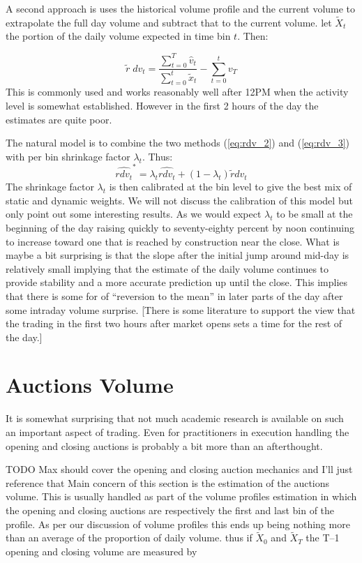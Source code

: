 A second approach is uses the historical volume profile and the current volume to extrapolate the full day volume and subtract that to the current volume. let $\tilde{X}_t$ the portion of the daily volume expected in time bin $t$. Then:

	\begin{equation}\label{eq:rdv_3}
		\tilde{r} \; dv_t= \dfrac{\sum_{t=0}^T \hat{v}_t }{\sum_{t=0}^t \tilde{x}_t} - \sum_{t=0}^t v_T
	\end{equation}
This is commonly used and works reasonably well after 12PM when the activity level is somewhat established. However in the first 2 hours of the day the estimates are quite poor.


The natural  model is to combine the two methods (\ref{eq:rdv_2}) and (\ref{eq:rdv_3}) with per bin shrinkage factor $\lambda_t$. Thus:
	\begin{equation}\label{eq:rdv_4}
	\widehat{rdv_t}^* = \lambda_t \widehat{rdv_t} + (1-\lambda_t) \tilde{r} dv_t
	\end{equation}
The shrinkage factor $\lambda_t$ is then calibrated at the bin level to give the best mix of static and dynamic weights. We will not discuss the calibration of this model but only point out some interesting results. As we would expect $\lambda_t$ to be small at the beginning of the day raising quickly to seventy-eighty percent by noon continuing to increase toward one that is reached by construction near the close. What is maybe a bit surprising is that the slope after the initial jump around mid-day is relatively small implying that the estimate of the daily volume continues to provide stability and a more accurate prediction up until the close. This implies that there is some for of ``reversion to the mean'' in later parts of the day after some intraday volume surprise. [There is some literature to support the view that the trading in the first two hours after market opens sets a time for the rest of the day.]


\section{Auctions Volume}

It is somewhat surprising that not much academic research is available on such an important aspect of trading. Even for practitioners in execution handling the opening and closing auctions is probably a bit more than an afterthought. 

TODO  Max should cover the opening and closing auction mechanics and I'll just reference that
Main concern of this section is the estimation of the auctions volume. This is usually handled as part of the volume profiles estimation in which the opening and closing auctions are respectively the first and last bin of the profile. As per our discussion of volume profiles this ends up being nothing more than an average of the proportion of daily volume. 
thus if $\tilde{X}_0$ and $\tilde{X}_T$ the T--1 opening and closing volume are measured by 

